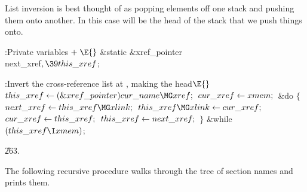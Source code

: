 List inversion is best thought of as popping elements off one stack and
pushing them onto another. In this case  will be the head of
the stack that we push things onto.

\Y\B\4:Private variables\X${}\mathrel+\E{}$\6
\&{static} \&{xref\_pointer} \\{next\_xref}${},\39\\{this\_xref}{}$;\par
\fi

\B{}:Invert the cross-reference list at , making %
 the head\X${}\E{}$\6
$\\{this\_xref}\K(\&{xref\_pointer})\,\\{cur\_name}\MG\\{xref};{}$\6
${}\\{cur\_xref}\leftarrow\\{xmem};{}$\6
\&{do}\5
${}\{{}$\1\6
${}\\{next\_xref}\K\\{this\_xref}\MG\\{xlink};{}$\6
${}\\{this\_xref}\MG\\{xlink}\K\\{cur\_xref};{}$\6
${}\\{cur\_xref}\leftarrow\\{this\_xref};{}$\6
${}\\{this\_xref}\leftarrow\\{next\_xref};{}$\6
\4${}\}{}$\2\5
\&{while} ${}(\\{this\_xref}\I\\{xmem}){}$;\par
\U263.\fi

The following recursive procedure walks through the tree of section
names and
prints them.

